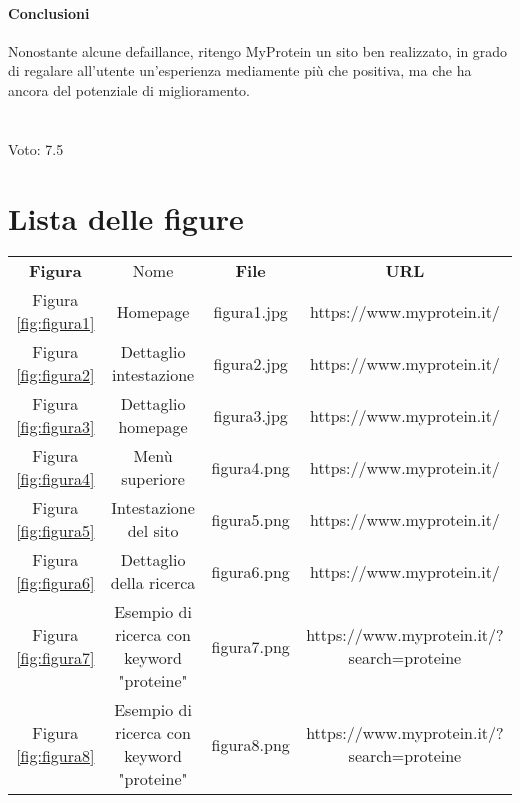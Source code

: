 \paragraph{Conclusioni} Nonostante alcune defaillance, ritengo MyProtein un sito ben realizzato, in grado di regalare all'utente un'esperienza mediamente più che positiva, ma che ha ancora del potenziale di miglioramento.\\
\\ \\{\huge Voto: 7.5}

\section{Lista delle figure}
\begin{center}
    \begin{tabular}{ c c c c }
        \textbf{Figura} & Nome & \textbf{File} & \textbf{URL} \\ 
        Figura \ref{fig:figura1} & Homepage & figura1.jpg & https://www.myprotein.it/ \\ 
        Figura \ref{fig:figura2} & Dettaglio intestazione & figura2.jpg & https://www.myprotein.it/ \\
        Figura \ref{fig:figura3} & Dettaglio homepage & figura3.jpg & https://www.myprotein.it/ \\
        Figura \ref{fig:figura4} & Menù superiore & figura4.png & https://www.myprotein.it/ \\
        Figura \ref{fig:figura5} & Intestazione del sito & figura5.png & https://www.myprotein.it/ \\
        Figura \ref{fig:figura6} & Dettaglio della ricerca & figura6.png & https://www.myprotein.it/ \\
        Figura \ref{fig:figura7} & Esempio di ricerca con keyword "proteine" & figura7.png & https://www.myprotein.it/?search=proteine \\
        Figura \ref{fig:figura8} & Esempio di ricerca con keyword "proteine" & figura8.png & https://www.myprotein.it/?search=proteine \\
    \end{tabular}
\end{center}
